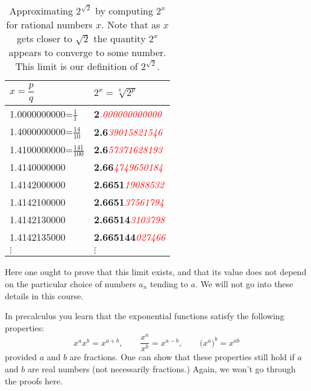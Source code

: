 \begin{table}[htdp]
  \begin{center}
    \begin{tabular}{ll}
      \toprule
      $x=\dfrac pq$  &  $\displaystyle 2^x = \sqrt[q]{2^p}$\\
      \midrule
      1.0000000000=$\frac11$ &
      \textbf{2}\textit{\textcolor{red}{.000000000000}}  \\[2pt]
      1.4000000000=$\frac{14}{10}$ &
      \textbf{2.6}\textit{\textcolor{red}{39015821546}}  \\[2pt]
      1.4100000000=$\frac{141}{100}$  &
      \textbf{2.6}\textit{\textcolor{red}{57371628193}}  \\[2pt]
      1.4140000000 &  \textbf{2.66}\textit{\textcolor{red}{4749650184}}  \\
      1.4142000000 &  \textbf{2.6651}\textit{\textcolor{red}{19088532}}  \\
      1.4142100000 &  \textbf{2.6651}\textit{\textcolor{red}{37561794}}  \\
      1.4142130000 &  \textbf{2.66514}\textit{\textcolor{red}{3103798}}  \\
      1.4142135000 &  \textbf{2.665144}\textit{\textcolor{red}{027466}}  \\
      $\vdots$  &\hspace{24pt} $\vdots$\\
      \bottomrule
    \end{tabular}
  \end{center}\smallskip
  \caption{Approximating $2^{\surd 2}$ by computing $2^x$ for rational
numbers $x$.  Note that as $x$ gets closer to $\sqrt2$ the quantity
$2^x$ appears to converge to some number.  This limit is our
definition of $2^{\surd2}$.}
  \label{tbl:07twototheroottwo}
\end{table}%


Here one ought to prove that this limit exists, and that its value does not
depend on the particular choice of numbers $a_n$ tending to $a$. We will not go
into these details in this course.

In precalculus you learn that the exponential functions satisfy the
following properties:
\begin{equation}\label{eq:exponential-properties}
  x^a x^b = x^{a+b}, \qquad
  \dfrac{x^a}{x^b} = x^{a-b}, \qquad
  \bigl(x^a\bigr)^b = x^{ab}
\end{equation}
provided $a$ and $b$ are fractions. One can show that these properties still
hold if $a$ and $b$ are real numbers (not necessarily fractions.) Again, we
won't go through the proofs here.

